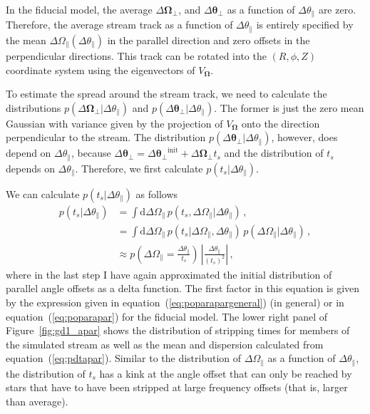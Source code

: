 \documentclass{emulateapj}
\newcommand{\dd}{\mathrm{d}}
\newcommand{\eqnname}{equation}
\newcommand{\equationname}{\eqnname}
\renewcommand{\figurename}{Figure}
\renewcommand{\vec}[1]{\ensuremath{\mathbf{#1}}}
\newcommand{\veco}{\ensuremath{\vec{\Omega}}}
\newcommand{\veca}{\ensuremath{\boldsymbol\theta}}
\newcommand{\apar}{\ensuremath{\theta_\parallel}}
\newcommand{\opar}{\ensuremath{\Omega_\parallel}}
\newcommand{\aperp}{\ensuremath{\veca_\perp}}
\newcommand{\operp}{\ensuremath{\veco_\perp}}
\newcommand{\ts}{\ensuremath{t_s}}
\begin{document}
In the fiducial model, the average $\Delta \operp$, and $\Delta
\aperp$ as a function of $\Delta \apar$ are zero. Therefore, the
average stream track as a function of $\Delta \apar$ is entirely
specified by the mean $\Delta \opar(\Delta \apar)$ in the parallel
direction and zero offsets in the perpendicular directions. This track
can be rotated into the $(R,\phi,Z)$ coordinate system using the
eigenvectors of $V_\veco$.

To estimate the spread around the stream track, we need to calculate
the distributions $p(\Delta \operp|\Delta \apar)$ and $p(\Delta
\aperp|\Delta \apar)$. The former is just the zero mean Gaussian with
variance given by the projection of $V_\veco$ onto the direction
perpendicular to the stream. The distribution $p(\Delta \aperp|\Delta
\apar)$, however, does depend on $\Delta \apar$, because $\Delta
\aperp = \Delta \aperp^{\mathrm{init}} + \Delta \operp \ts$ and
the distribution of $\ts$ depends on $\Delta \apar$. Therefore,
we first calculate $p(\ts | \Delta \apar)$.

We can calculate $p(\ts | \Delta \apar)$ as follows
\begin{equation}\label{eq:pdtapar}
\begin{split}
  p(\ts | \Delta \apar) & = \int \dd \Delta \opar\,p(\ts,\Delta \opar|\Delta \apar)\,,\\
  & = \int \dd \Delta \opar\,p(\ts|\Delta \opar,\Delta \apar)\,p(\Delta \opar|\Delta \apar)\,,\\
  & \approx p\left(\Delta \opar = \frac{\Delta \apar}{\ts}\right)\,\left|\frac{\Delta \apar}{(\ts)^2}\right|\,,
\end{split}
\end{equation}
where in the last step I have again approximated the initial
distribution of parallel angle offsets as a delta function. The first
factor in this equation is given by the expression given in
\equationname~(\ref{eq:poparapargeneral}) (in general) or in
\equationname~(\ref{eq:poparapar}) for the fiducial model. The lower
right panel of \figurename~\ref{fig:gd1_apar} shows the distribution
of stripping times for members of the simulated stream as well as the
mean and dispersion calculated from
\equationname~(\ref{eq:pdtapar}). Similar to the distribution of
$\Delta \opar$ as a function of $\Delta \apar$, the distribution of
$\ts$ has a kink at the angle offset that can only be reached by stars
that have to have been stripped at large frequency offsets (that is,
larger than average).
\end{document}
